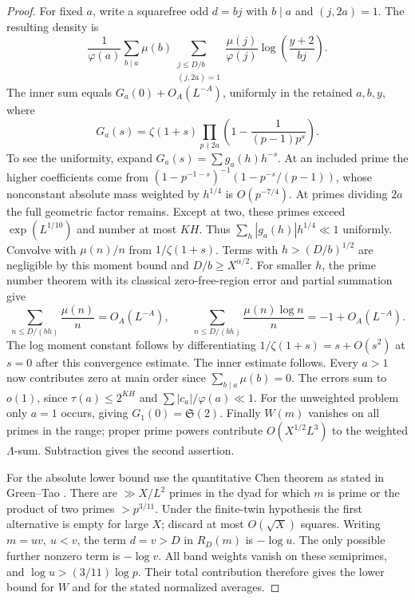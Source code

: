 \documentclass[11pt]{article}
\begin{document}
\begin{proof}
For fixed \(a\), write a squarefree odd \(d=bj\) with
\(b\mid a\) and \((j,2a)=1\). The resulting density is
\[
 \frac1{\varphi(a)}
 \sum_{b\mid a}\mu(b)
 \sum_{\substack{j\le D/b\\(j,2a)=1}}
  \frac{\mu(j)}{\varphi(j)}\log\!\left(\frac{y+2}{bj}\right).
\]
The inner sum equals \(G_a(0)+O_A(L^{-A})\), uniformly in the
retained \(a,b,y\), where
\[
 G_a(s)=\zeta(1+s)
         \prod_{p\nmid 2a}\left(1-\frac{1}{(p-1)p^s}\right).
\]
To see the uniformity, expand \(G_a(s)=\sum g_a(h)h^{-s}\).
At an included prime the higher coefficients come from
\((1-p^{-1-s})^{-1}(1-p^{-s}/(p-1))\), whose nonconstant absolute
mass weighted by \(h^{1/4}\) is \(O(p^{-7/4})\). At primes
dividing \(2a\) the full geometric factor remains. Except at two,
these primes exceed \(\exp(L^{1/10})\) and number at most \(KH\).
Thus \(\sum_h |g_a(h)|h^{1/4}\ll1\) uniformly. Convolve with
\(\mu(n)/n\) from \(1/\zeta(1+s)\). Terms with
\(h>(D/b)^{1/2}\) are negligible by this moment bound and
\(D/b\ge X^{\alpha/2}\). For smaller \(h\), the prime number theorem
with its classical zero-free-region error and partial summation give
\[
 \sum_{n\le D/(bh)}\frac{\mu(n)}n=O_A(L^{-A}),\qquad
 \sum_{n\le D/(bh)}\frac{\mu(n)\log n}{n}=-1+O_A(L^{-A}).
\]
The log moment constant follows by differentiating
\(1/\zeta(1+s)=s+O(s^2)\) at \(s=0\) after this convergence estimate.
The inner estimate follows. Every \(a>1\) now contributes zero
at main order since \(\sum_{b\mid a}\mu(b)=0\).
The errors sum to \(o(1)\), since \(\tau(a)\le 2^{KH}\) and
\(\sum |c_a|/\varphi(a)\ll1\).
For the unweighted problem only \(a=1\) occurs, giving
\(G_1(0)=\mathfrak S(2)\). Finally \(W(m)\) vanishes on all primes
in the range; proper prime powers contribute
\(O(X^{1/2} L^3)\) to the weighted \(\Lambda\)-sum. Subtraction
gives the second assertion.

For the absolute lower bound use the quantitative Chen theorem
as stated in Green--Tao \cite[Theorem 6.1]{ChenGT}. There are
\(\gg X/L^2\) primes in the dyad for which \(m\) is prime or the
product of two primes \(>p^{3/11}\). Under the finite-twin hypothesis
the first alternative is empty for large \(X\); discard at most
\(O(\sqrt X)\) squares. Writing \(m=uv,\ u<v\), the term \(d=v>D\)
in \(R_D(m)\) is \(-\log u\). The only possible further
nonzero term is \(-\log v\). All band weights vanish on these
semiprimes, and \(\log u>(3/11)\log p\). Their total contribution
therefore gives the lower bound for \(W\) and for the stated
normalized averages.
\end{proof}
\end{document}
